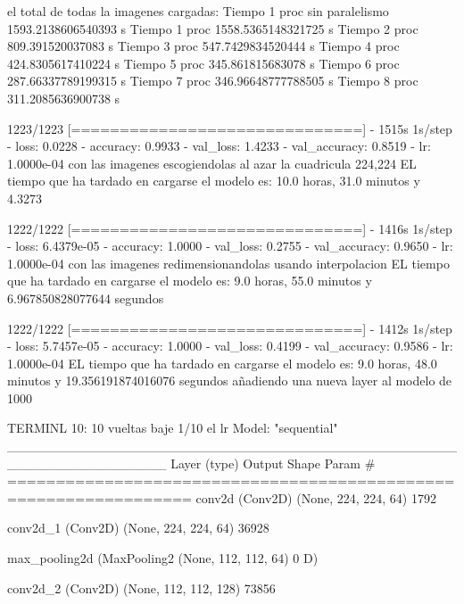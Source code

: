 \documentclass[11pt, a4paper]{article} %
\begin{document}
el total de todas la imagenes cargadas:
Tiempo 1 proc sin paralelismo       1593.2138606540393 s
Tiempo 1 proc                       1558.5365148321725 s
Tiempo 2 proc                       809.391520037083   s
Tiempo 3 proc                       547.7429834520444  s
Tiempo 4 proc                       424.8305617410224  s
Tiempo 5 proc                       345.861815683078   s
Tiempo 6 proc                       287.66337789199315 s
Tiempo 7 proc                       346.96648777788505 s
Tiempo 8 proc                       311.2085636900738  s


1223/1223 [==============================] - 1515s 1s/step - loss: 0.0228 - accuracy: 0.9933 - val_loss: 1.4233 - val_accuracy: 0.8519 - lr: 1.0000e-04 con las imagenes escogiendolas al azar la cuadricula 224,224
EL tiempo que ha tardado en cargarse el modelo es: 10.0 horas, 31.0 minutos y 4.3273

1222/1222 [==============================] - 1416s 1s/step - loss: 6.4379e-05 - accuracy: 1.0000 - val_loss: 0.2755 - val_accuracy: 0.9650 - lr: 1.0000e-04 con las imagenes redimensionandolas usando interpolacion 
EL tiempo que ha tardado en cargarse el modelo es: 9.0 horas, 55.0 minutos y 6.967850828077644 segundos

1222/1222 [==============================] - 1412s 1s/step - loss: 5.7457e-05 - accuracy: 1.0000 - val_loss: 0.4199 - val_accuracy: 0.9586 - lr: 1.0000e-04
EL tiempo que ha tardado en cargarse el modelo es: 9.0 horas, 48.0 minutos y 19.356191874016076 segundos añadiendo una nueva layer al modelo de 1000

TERMINL 10: 10 vueltas baje 1/10 el lr
Model: "sequential"
_________________________________________________________________
 Layer (type)                Output Shape              Param #   
=================================================================
 conv2d (Conv2D)             (None, 224, 224, 64)      1792      
                                                                 
 conv2d_1 (Conv2D)           (None, 224, 224, 64)      36928     
                                                                 
 max_pooling2d (MaxPooling2  (None, 112, 112, 64)      0         
 D)                                                              
                                                                 
 conv2d_2 (Conv2D)           (None, 112, 112, 128)     73856     
                                                                 
\end{document}

